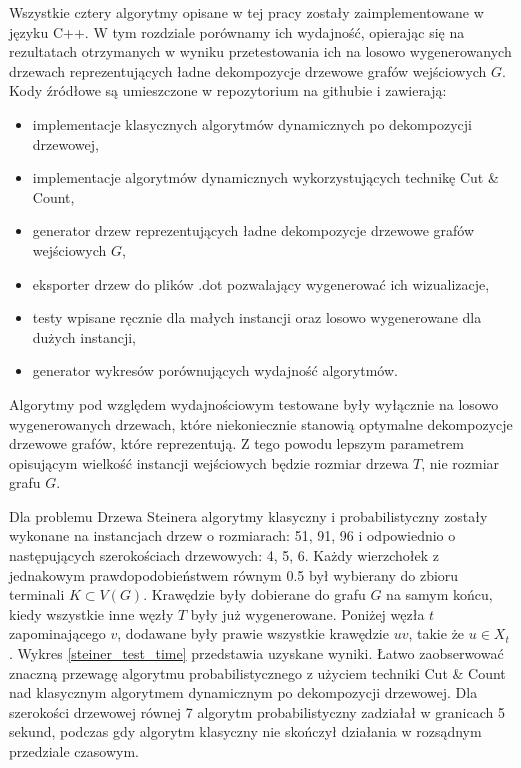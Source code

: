 \documentclass[12pt, oneside]{report}
\begin{document}
Wszystkie cztery algorytmy opisane w tej pracy zostały zaimplementowane w języku C++. W tym rozdziale porównamy ich wydajność, opierając się na rezultatach otrzymanych w wyniku przetestowania ich na losowo wygenerowanych drzewach reprezentujących ładne dekompozycje drzewowe grafów wejściowych $G$. Kody źródłowe są umieszczone w repozytorium na githubie \cite{github} i zawierają: 
\begin{itemize}[label=$-$]
\item implementacje klasycznych algorytmów dynamicznych po dekompozycji drzewowej,
\item implementacje algorytmów dynamicznych wykorzystujących technikę Cut \& Count,
\item generator drzew reprezentujących ładne dekompozycje drzewowe grafów wejściowych $G$,
\item eksporter drzew do plików .dot pozwalający wygenerować ich wizualizacje,
\item testy wpisane ręcznie dla małych instancji oraz losowo wygenerowane dla dużych instancji,  
\item generator wykresów porównujących wydajność algorytmów.
\end{itemize}  

Algorytmy pod względem wydajnościowym testowane były wyłącznie na losowo wygenerowanych drzewach, które niekoniecznie stanowią optymalne dekompozycje drzewowe grafów, które reprezentują. Z tego powodu lepszym parametrem opisującym wielkość instancji wejściowych będzie rozmiar drzewa $T$, nie rozmiar grafu $G$.

Dla problemu Drzewa Steinera algorytmy klasyczny i probabilistyczny zostały wykonane na instancjach drzew o rozmiarach: 51, 91, 96 i odpowiednio o  następujących szerokościach drzewowych: 4, 5, 6. Każdy wierzchołek z jednakowym prawdopodobieństwem równym 0.5 był wybierany do zbioru terminali $K \subset V(G)$. Krawędzie były dobierane do grafu $G$ na samym końcu, kiedy wszystkie inne węzły $T$ były już wygenerowane. Poniżej węzła $t$ zapominającego $v$, dodawane były prawie wszystkie krawędzie $uv$, takie że $u \in X_t$. Wykres \ref{steiner_test_time} przedstawia uzyskane wyniki. Łatwo zaobserwować znaczną przewagę algorytmu probabilistycznego z użyciem techniki Cut \& Count nad klasycznym algorytmem dynamicznym po dekompozycji drzewowej. Dla szerokości drzewowej równej 7 algorytm probabilistyczny zadziałał w granicach 5 sekund, podczas gdy algorytm klasyczny nie skończył działania w rozsądnym przedziale czasowym. 
\end{document}
